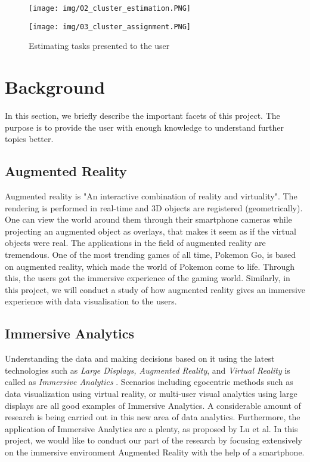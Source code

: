 \documentclass[journal]{vgtc}                %
\begin{document}
\begin{figure}[ht]
    \begin{minipage}[b]{0.45\linewidth}
        \centering
        \texttt{[image: img/02\_cluster\_estimation.PNG]}
    \end{minipage}
    \hspace{0.5cm}
    \begin{minipage}[b]{0.45\linewidth}
        \centering
        \texttt{[image: img/03\_cluster\_assignment.PNG]}
    \end{minipage}
    \caption{Estimating tasks presented to the user}
\end{figure}

\section{Background}

In this section, we briefly describe the important facets of this project. The purpose is to provide the user with enough knowledge to understand further topics better.

\subsection{Augmented Reality}

Augmented reality is "An interactive combination of reality and virtuality"\cite{Billinghurst2014}. The rendering is performed in real-time and 3D objects are registered (geometrically). One can view the world around them through their smartphone cameras while projecting an augmented object as overlays, that makes it seem as if the virtual objects were real. The applications in the field of augmented reality are tremendous. One of the most trending games of all time, Pokemon Go, is based on augmented reality, which made the world of Pokemon come to life. Through this, the users got the immersive experience of the gaming world. Similarly, in this project, we will conduct a study of how augmented reality gives an immersive experience with data visualisation to the users.
 
 
\subsection{Immersive Analytics}
Understanding the data and making decisions based on it using the latest technologies such as \textit{Large Displays, Augmented Reality}, and \textit{Virtual Reality} is called as \textit{Immersive Analytics} \cite{Chandler2015}\cite{bach2016immersive}. Scenarios including egocentric methods such as data visualization using virtual reality, or multi-user visual analytics using large displays are all good examples of Immersive Analytics. A considerable amount of research is being carried out in this new area of data analytics. Furthermore, the application of Immersive Analytics are a plenty\cite{lu2016towards}, as proposed by Lu et al. In this project, we would like to conduct our part of the research by focusing extensively on the immersive environment Augmented Reality with the help of a smartphone.
\end{document}
